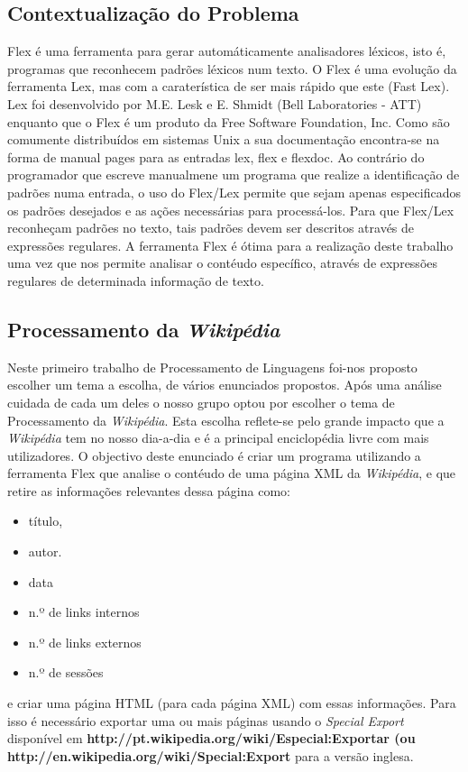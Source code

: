 \documentclass[11pt, a4paper, oneside]{article}
\begin{document}
\subsection{Contextualização do Problema}

Flex é uma ferramenta para gerar automáticamente analisadores léxicos, isto é, programas que reconhecem padrões léxicos num texto. O Flex é uma evolução da ferramenta Lex, mas com a caraterística de ser mais rápido que este (Fast Lex). Lex foi desenvolvido por M.E. Lesk e E. Shmidt (Bell Laboratories - ATT) enquanto que o Flex é um produto da Free Software Foundation, Inc. Como são comumente distribuídos em sistemas Unix a sua documentação encontra-se na forma de manual pages para as entradas lex, flex e flexdoc. Ao contrário do programador que escreve manualmene um programa que realize a identificação de padrões numa entrada, o uso do Flex/Lex permite que sejam apenas especificados os padrões desejados e as ações necessárias para processá-los. Para que Flex/Lex reconheçam padrões no texto, tais padrões devem ser descritos através de expressões regulares. A ferramenta Flex é ótima para a realização deste trabalho uma vez que nos permite analisar o contéudo específico, através de expressões regulares de determinada informação de texto.

\subsection{Processamento da \textit{Wikipédia}}
Neste primeiro trabalho de Processamento de Linguagens foi-nos proposto escolher um tema a escolha, de vários enunciados propostos. Após uma análise cuidada  de cada um deles o nosso grupo optou por escolher o tema de Processamento da \textit{Wikipédia}. Esta escolha reflete-se pelo grande impacto que a \textit{Wikipédia} tem no nosso dia-a-dia e é a principal enciclopédia livre com mais utilizadores. 
O objectivo deste enunciado é criar um programa utilizando a ferramenta Flex que analise o contéudo de uma página XML da \textit{Wikipédia}, e que retire as informações relevantes dessa página como:
\begin{itemize}
\item título,
\item autor.
\item data
\item n.º de links internos
\item n.º de links externos
\item n.º de sessões 
\end{itemize}
e criar uma página HTML (para cada página XML) com essas informações. Para isso é necessário exportar uma ou mais páginas usando o \textit{Special Export} disponível em \textbf{http://pt.wikipedia.org/wiki/Especial:Exportar (ou \\http://en.wikipedia.org/wiki/Special:Export} para a versão inglesa.
\newpage
\end{document}

